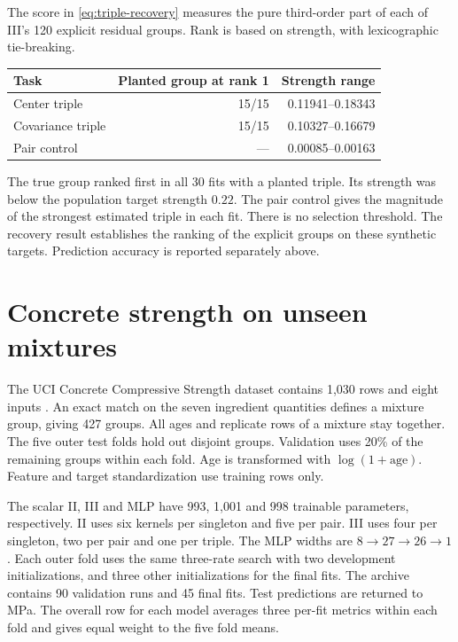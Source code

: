 \documentclass[11pt]{article}
\numberwithin{equation}{section}
\begin{document}
The score in \eqref{eq:triple-recovery} measures the pure third-order
part of each of III's 120 explicit residual groups. Rank is based on
strength, with lexicographic tie-breaking.

\begin{center}
\small
\begin{tabularx}{\linewidth}{@{} Y r r @{}}
\toprule
\textbf{Task} & \textbf{Planted group at rank 1} & \textbf{Strength range} \\
\midrule
Center triple & 15/15 & 0.11941--0.18343 \\
Covariance triple & 15/15 & 0.10327--0.16679 \\
Pair control & --- & 0.00085--0.00163 \\
\bottomrule
\end{tabularx}
\end{center}

The true group ranked first in all 30 fits with a planted triple.
Its strength was below the population target strength \(0.22\).
The pair control gives the magnitude of the strongest estimated triple
in each fit. There is no selection threshold. The recovery result
establishes the ranking of the explicit groups on these synthetic
targets. Prediction accuracy is reported separately above.

\section{Concrete strength on unseen mixtures}
\label{sec:concrete-order}

The UCI Concrete Compressive Strength dataset contains 1,030 rows and
eight inputs \cite{yeh1998concrete}. An exact match on the seven ingredient
quantities defines a mixture group, giving 427 groups. All ages and
replicate rows of a mixture stay together. The five outer test folds
hold out disjoint groups. Validation uses 20\% of the remaining groups
within each fold. Age is transformed with \(\log(1+\mathrm{age})\).
Feature and target standardization use training rows only.

The scalar II, III and MLP have 993, 1,001 and 998 trainable parameters,
respectively. II uses six kernels per singleton and five per pair. III
uses four per singleton, two per pair and one per triple. The MLP widths
are \(8\to27\to26\to1\). Each outer fold uses the same three-rate search with two
development initializations, and three other initializations for the
final fits. The archive contains 90 validation runs and 45 final fits.
Test predictions are returned to MPa. The overall row for each model
averages three per-fit metrics within each fold and gives equal weight
to the five fold means.
\end{document}
